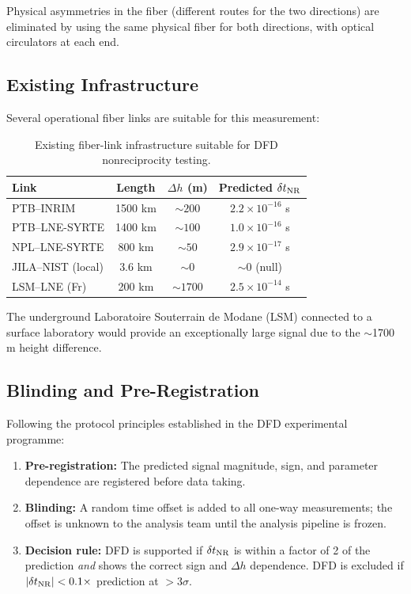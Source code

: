\documentclass[12pt,a4paper,twocolumn]{article}
\begin{document}
Physical asymmetries in the fiber (different routes for the two
directions) are eliminated by using the same physical fiber for
both directions, with optical circulators at each end.

\subsection{Existing Infrastructure}

Several operational fiber links are suitable for this measurement:

\begin{table}[t]
\centering
\caption{Existing fiber-link infrastructure suitable for DFD
nonreciprocity testing.}
\label{tab:links}
\renewcommand{\arraystretch}{1.2}
\small
\begin{tabular}{@{}lccc@{}}
\toprule
Link & Length & $\Delta h$ (m) & Predicted $\delta t_{\rm NR}$ \\
\midrule
PTB--INRIM & 1500 km & $\sim 200$ & $2.2\times 10^{-16}$ s \\
PTB--LNE-SYRTE & 1400 km & $\sim 100$ & $1.0\times 10^{-16}$ s \\
NPL--LNE-SYRTE & 800 km & $\sim 50$ & $2.9\times 10^{-17}$ s \\
JILA--NIST (local) & 3.6 km & $\sim 0$ & $\sim 0$ (null) \\
LSM--LNE (Fr) & 200 km & $\sim 1700$ & $2.5\times 10^{-14}$ s \\
\bottomrule
\end{tabular}
\end{table}

The underground Laboratoire Souterrain de Modane (LSM) connected
to a surface laboratory would provide an exceptionally large signal
due to the $\sim$1700 m height difference.

\subsection{Blinding and Pre-Registration}

Following the protocol principles established in the DFD experimental
programme:
\begin{enumerate}[nosep]
\item \textbf{Pre-registration:} The predicted signal magnitude,
sign, and parameter dependence are registered before data taking.
\item \textbf{Blinding:} A random time offset is added to all
one-way measurements; the offset is unknown to the analysis team
until the analysis pipeline is frozen.
\item \textbf{Decision rule:} DFD is supported if
$\delta t_{\rm NR}$ is within a factor of 2 of the prediction
\emph{and} shows the correct sign and $\Delta h$ dependence.
DFD is excluded if $|\delta t_{\rm NR}| < 0.1\times$ prediction
at $>3\sigma$.
\end{enumerate}
\end{document}
